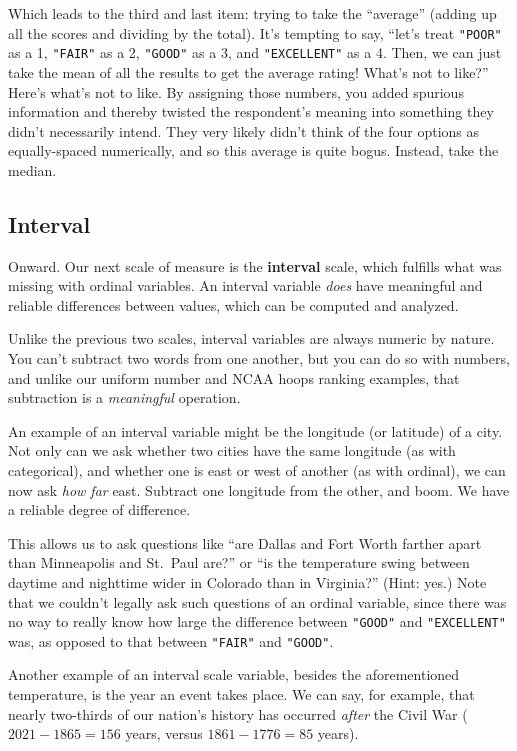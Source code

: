 Which leads to the third and last item: trying to take the ``average'' (adding
up all the scores and dividing by the total). It's tempting to say, ``let's
treat \texttt{"POOR"} as a 1, \texttt{"FAIR"} as a 2, \texttt{"GOOD"} as a 3,
and \texttt{"EXCELLENT"} as a 4. Then, we can just take the mean of all the
results to get the average rating! What's not to like?'' Here's what's not to
like. By assigning those numbers, you added spurious information and thereby
twisted the respondent's meaning into something they didn't necessarily intend.
They very likely didn't think of the four options as equally-spaced
numerically, and so this average is quite bogus. Instead, take the median.


\subsection{Interval}

Onward. Our next scale of measure is the \textbf{interval} scale, which
fulfills what was missing with ordinal variables. An interval variable
\textit{does} have meaningful and reliable differences between values, which
can be computed and analyzed.

Unlike the previous two scales, interval variables are always numeric by
nature. You can't subtract two words from one another, but you can do so with
numbers, and unlike our uniform number and NCAA hoops ranking examples, that
subtraction is a \textit{meaningful} operation.

An example of an interval variable might be the longitude (or latitude) of a
city. Not only can we ask whether two cities have the same longitude (as with
categorical), and whether one is east or west of another (as with ordinal), we
can now ask \textit{how far} east. Subtract one longitude from the other, and
boom. We have a reliable degree of difference.

This allows us to ask questions like ``are Dallas and Fort Worth farther apart
than Minneapolis and St.~Paul are?'' or ``is the temperature swing between
daytime and nighttime wider in Colorado than in Virginia?'' (Hint: yes.) Note
that we couldn't legally ask such questions of an ordinal variable, since there
was no way to really know how large the difference between \texttt{"GOOD"} and
\texttt{"EXCELLENT"} was, as opposed to that between \texttt{"FAIR"} and
\texttt{"GOOD"}.

Another example of an interval scale variable, besides the aforementioned
temperature, is the year an event takes place. We can say, for example, that
nearly two-thirds of our nation's history has occurred \textit{after} the Civil
War ($2021-1865=156$ years, versus $1861-1776=85$ years).

